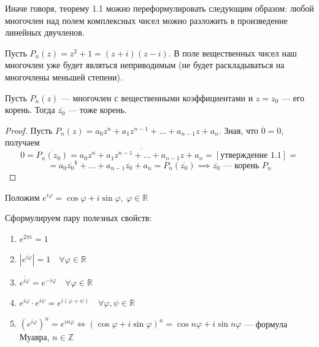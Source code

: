 \documentclass[11pt]{article}
\begin{document}
\begin{remark}
  Иначе говоря, теорему 1.1 можно переформулировать следующим образом: любой многочлен над полем комплексных чисел можно разложить в произведение линейных двучленов.
\end{remark}

\begin{example}
  Пусть $P_n(z) = z^2 + 1 = (z + i)(z - i)$. В поле вещественных чисел наш многочлен уже будет являться неприводимым (не будет раскладываться на многочлены меньшей степени). 
\end{example}

\begin{statement}
  Пусть $P_n(z)$ --- многочлен с вещественными коэффициентами и $z = z_0$ --- его корень. Тогда $\overline{z_0}$ --- тоже корень.
\end{statement}

\begin{proof}
  Пусть $P_n(z) = a_0z^n + a_1z^{n - 1} + \ldots + a_{n - 1}z + a_n$. Зная, что $\overline{0} = 0$, получаем 
  \[0 = \overline{P_n(z_0)} = \overline{a_0z^n + a_1z^{n - 1} + \ldots + a_{n - 1}z + a_n} = [\text{утверждение 1.1}] = \]
  \[= a_0\overline{z_0}^k + \ldots + a_{n - 1}\overline{z_0} + a_n = P_n(\overline{z_0}) \implies \text{$\overline{z_0}$ --- корень $P_n$}\]
\end{proof}

\begin{definition}
  Положим $e^{i\varphi} = \cos\varphi + i\sin\varphi, \ \varphi \in \mathbb{R}$
\end{definition}

\begin{remark}
  Сформулируем пару полезных свойств:
  \begin{enumerate}
    \item $e^{2\pi i} = 1$
    \item $|e^{i\varphi}| = 1 \quad \forall \varphi \in \mathbb{R}$
    \item $\overline{e^{i\varphi}} = e^{-i\varphi} \quad \forall \varphi \in \mathbb{R}$
    \item $e^{i\varphi} \cdot e^{i\psi} = e^{i(\varphi + \psi)} \quad \forall \varphi, \psi \in \mathbb{R}$
    \item $(e^{i\varphi})^n = e^{in\varphi} \Longleftrightarrow (\cos\varphi + i\sin\varphi)^n = \cos n\varphi + i\sin n\varphi$ --- формула Муавра, $n \in \mathbb{Z}$ 
  \end{enumerate}
\end{remark}
\end{document}
